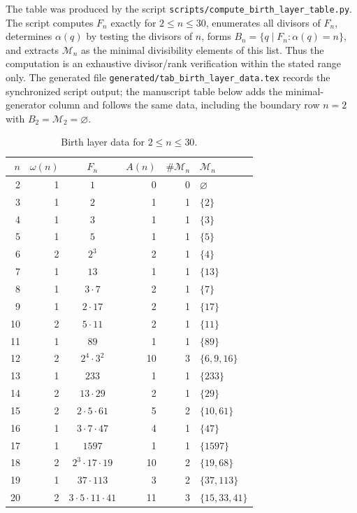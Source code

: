 \documentclass[11pt,letterpaper]{article}
\numberwithin{equation}{section}
\theoremstyle{plain}
\theoremstyle{definition}
\theoremstyle{remark}
\begin{document}
The table was produced by the script
\texttt{scripts/compute\_birth\_layer\_table.py}. The script computes
$F_n$ exactly for $2\le n\le30$, enumerates all divisors of $F_n$, determines
$\alpha(q)$ by testing the divisors of $n$, forms
$B_n=\{q\mid F_n:\alpha(q)=n\}$, and extracts $\mathcal M_n$ as the minimal
divisibility elements of this list. Thus the computation is an exhaustive
divisor/rank verification within the stated range only. The generated file
\texttt{generated/tab\_birth\_layer\_data.tex} records the synchronized
script output; the manuscript table below adds the minimal-generator column
and follows the same data, including the boundary row $n=2$ with
$B_2=\mathcal M_2=\varnothing$.

\begin{table}[ht]
\centering
\small
\caption{Birth layer data for $2\le n\le 30$.}
\label{tab:birth-layer-data}
\begin{tabular}{rrcrrl}
\toprule
$n$ & $\omega(n)$ & $F_n$ & $A(n)$ & $\#\mathcal{M}_n$ &
$\mathcal{M}_n$ \\
\midrule
 2 & 1 & $1$ & 0 & 0 & $\varnothing$\\
 3 & 1 & $2$ & 1 & 1 & $\{2\}$\\
 4 & 1 & $3$ & 1 & 1 & $\{3\}$\\
 5 & 1 & $5$ & 1 & 1 & $\{5\}$\\
 6 & 2 & $2^3$ & 2 & 1 & $\{4\}$\\
 7 & 1 & $13$ & 1 & 1 & $\{13\}$\\
 8 & 1 & $3\cdot 7$ & 2 & 1 & $\{7\}$\\
 9 & 1 & $2\cdot 17$ & 2 & 1 & $\{17\}$\\
 10 & 2 & $5\cdot 11$ & 2 & 1 & $\{11\}$\\
 11 & 1 & $89$ & 1 & 1 & $\{89\}$\\
 12 & 2 & $2^4\cdot 3^2$ & 10 & 3 & $\{6,9,16\}$\\
 13 & 1 & $233$ & 1 & 1 & $\{233\}$\\
 14 & 2 & $13\cdot 29$ & 2 & 1 & $\{29\}$\\
 15 & 2 & $2\cdot 5\cdot 61$ & 5 & 2 & $\{10,61\}$\\
 16 & 1 & $3\cdot 7\cdot 47$ & 4 & 1 & $\{47\}$\\
 17 & 1 & $1597$ & 1 & 1 & $\{1597\}$\\
 18 & 2 & $2^3\cdot 17\cdot 19$ & 10 & 2 & $\{19,68\}$\\
 19 & 1 & $37\cdot 113$ & 3 & 2 & $\{37,113\}$\\
 20 & 2 & $3\cdot 5\cdot 11\cdot 41$ & 11 & 3 & $\{15,33,41\}$\\

\end{tabular}
\end{table}
\end{document}
